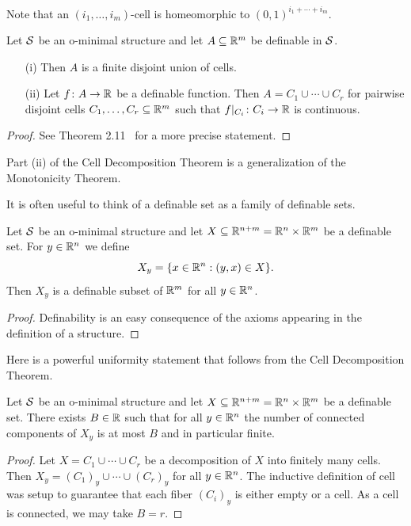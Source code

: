 Note that an $(i_1,\ldots,i_m)$-cell is homeomorphic to
$(0,1)^{i_1+\cdots+i_m}$. 


\begin{theorem}
  Let ${\mathcal S}$ be an o-minimal structure and let $A\subseteq{\mathbb{R}}^m$ be
  definable in ${\mathcal S}$.
  \begin{enumerate}
  \item [(i)] Then $A$ is a
    finite disjoint union of cells.
  \item[(ii)] Let $f\colon A\rightarrow{\mathbb{R}}$ be 
    a definable function. Then $A=C_1\cup\cdots \cup C_r$ for pairwise
    disjoint cells $C_1,\ldots,C_r\subseteq{\mathbb{R}}^m$ such that
    $f|_{C_i}\colon C_i\rightarrow{\mathbb{R}}$ is continuous. 
  \end{enumerate}
\end{theorem}
\begin{proof}
  See Theorem 2.11~\cite{D:oMin} for  a more precise statement. 
\end{proof}
Part (ii) of the Cell Decomposition Theorem is a generalization of
the Monotonicity Theorem.

It is often useful to think of a definable set as a family of
definable sets. 
\begin{deflemma}
  Let ${\mathcal S}$ be an o-minimal structure and let $X\subseteq {\mathbb{R}}^{n+m}= {\mathbb{R}}^{n}\times
  {\mathbb{R}}^m$ be a definable set. For $y\in{\mathbb{R}}^n$ we define
  \begin{equation*}
    X_y = \{ x\in{\mathbb{R}}^n : (y,x)\in X\}. 
  \end{equation*}
  Then $X_y$ is a definable subset of ${\mathbb{R}}^m$ for all $y\in{\mathbb{R}}^n$. 
\end{deflemma}
\begin{proof}
  Definability is an easy consequence of the axioms appearing in the
  definition of a structure. 
\end{proof}

Here is a powerful uniformity statement that follows from the Cell
Decomposition Theorem.

\begin{theorem}
  Let ${\mathcal S}$ be an o-minimal structure and let $X\subseteq {\mathbb{R}}^{n+m}= {\mathbb{R}}^{n}\times
  {\mathbb{R}}^m$ be a definable set. There exists $B\in{\mathbb{R}}$ such that for all
  $y\in{\mathbb{R}}^n$ the number of
  connected components of $X_y$ is at most $B$ and in particular finite.
\end{theorem}
\begin{proof}
  Let $X=C_1\cup\cdots\cup C_r$ be a decomposition of $X$ into
  finitely many cells. Then $X_y = (C_1)_{y}\cup \cdots \cup (C_r)_y$
  for all $y\in{\mathbb{R}}^n$. The inductive definition of cell was setup to
  guarantee
  that each fiber $(C_i)_y$ is either empty or a cell. As a cell is
  connected, we may take $B=r$.  
\end{proof}

